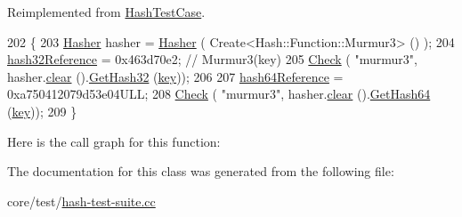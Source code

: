 Reimplemented from \hyperlink{classHashTestCase_a4fe6e6b9431c983ed52fd472e9f0d3b4}{Hash\+Test\+Case}.


\begin{DoxyCode}
202 \{
203   \hyperlink{classns3_1_1Hasher}{Hasher} hasher = \hyperlink{classns3_1_1Hasher}{Hasher} ( Create<Hash::Function::Murmur3> () );
204   \hyperlink{classHashTestCase_ae09d132ca1bd82e42b9beedbf98f9b45}{hash32Reference} = 0x463d70e2;  \textcolor{comment}{// Murmur3(key)}
205   \hyperlink{classHashTestCase_a798edd071714c5f3ff76a087622e097c}{Check} ( \textcolor{stringliteral}{"murmur3"}, hasher.\hyperlink{classns3_1_1Hasher_a629108aa89019d84af8b2d85c7185f54}{clear} ().\hyperlink{classns3_1_1Hasher_ae3508556dba4c2f4fc4901a059623117}{GetHash32} (\hyperlink{classHashTestCase_a955e1a4f01ad2ae6474e52e3bd403069}{key}));
206 
207   \hyperlink{classHashTestCase_a5e302abe033e775847dcf8856a94fea2}{hash64Reference} = 0xa750412079d53e04ULL;
208   \hyperlink{classHashTestCase_a798edd071714c5f3ff76a087622e097c}{Check} ( \textcolor{stringliteral}{"murmur3"}, hasher.\hyperlink{classns3_1_1Hasher_a629108aa89019d84af8b2d85c7185f54}{clear} ().\hyperlink{classns3_1_1Hasher_a88d83c8f9ae40f84df743b3efae2d9ce}{GetHash64} (\hyperlink{classHashTestCase_a955e1a4f01ad2ae6474e52e3bd403069}{key}));
209 \}
\end{DoxyCode}


Here is the call graph for this function\+:




The documentation for this class was generated from the following file\+:\begin{DoxyCompactItemize}
\item 
core/test/\hyperlink{hash-test-suite_8cc}{hash-\/test-\/suite.\+cc}\end{DoxyCompactItemize}
